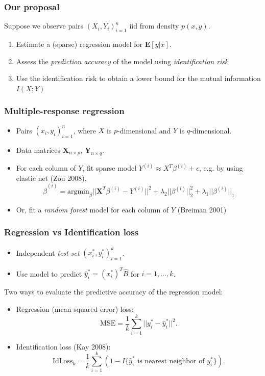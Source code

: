 \documentclass{beamer}
\newcommand{\E}{\textbf{E}}
\newcommand{\bX}{\boldsymbol{X}}
\newcommand{\bY}{\boldsymbol{Y}}
\begin{document}
\begin{frame}
\frametitle{Our proposal}
Suppose we observe pairs $(X_i,Y_i)_{i=1}^n$ iid from density $p(x, y)$.
\begin{enumerate}
\item Estimate a (sparse) regression model for $\E[y|x]$.
\item Assess the \emph{prediction accuracy} of the model using \emph{identification risk}
\item Use the identification risk to obtain a lower bound for the mutual information $I(X; Y)$
\end{enumerate}
\end{frame}

\begin{frame}
\frametitle{Multiple-response regression}
\begin{itemize}
\item Pairs $(x_i,y_i)_{i=1}^n$, where $X$ is $p$-dimensional and $Y$ is $q$-dimensional.
\item Data matrices $\bX_{n \times p}$, $\bY_{n \times q}$.
\item For each column of $Y$, fit sparse model $Y^{(i)} \approx X^T \beta^{(i)}  + \epsilon$, e.g. by using elastic net (Zou 2008), 
\[
\hat{\beta}^{(i)} = \text{argmin}_\beta ||\bX^T \beta^{(i)} - Y^{(i)}||^2 + \lambda_2 ||\beta^{(i)}||_2^2 + \lambda_1 ||\beta^{(i)}||_1
\]
\item Or, fit a \emph{random forest} model for each column of $Y$ (Breiman 2001)
\end{itemize}
\end{frame}


\begin{frame}
\frametitle{Regression vs Identification loss}
\begin{itemize}
\item Independent \emph{test set} $(x_i^*, y_i^*)_{i=1}^k$. 
\item Use model to predict $\hat{y}_i^* = (x_i^*)^T \hat{B}$ for $i = 1,\hdots, k$.
\end{itemize}
Two ways to evaluate the predictive accuracy of the regression model:
\begin{itemize}
\item Regression (mean squared-error) loss:
\[
\text{MSE} = \frac{1}{k} \sum_{i=1}^k ||y_i^* - \hat{y}_i^*||^2.
\]
\item Identification loss (Kay 2008):
\[
\text{IdLoss}_k = \frac{1}{k} \sum_{i=1}^k (1 - I\{\hat{y}_i^* \text{ is nearest neighbor of }y_i^*\}).
\]
\end{itemize}
\end{frame}
\end{document}
